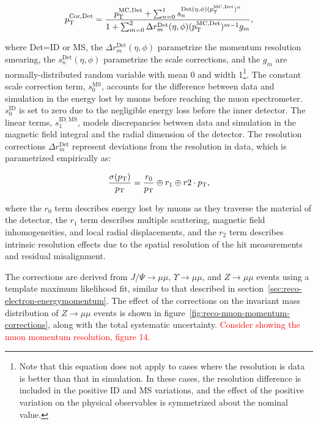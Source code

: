 \begin{equation}
	\pt^{\mathrm{Cor,Det}} = \frac{\pt^{\mathrm{MC,Det}} + \sum_{n=0}^1 s_n^{\mathrm{Det}(\eta,\phi)(\pt^{\mathrm{MC,Det}})^n}}{1+\sum_{m=0}^2 \Delta r_m^{\mathrm{Det}}(\eta,\phi)(\pt^{\mathrm{MC,Det}})^{m-1}g_m},
\end{equation}

where Det=ID or MS, the $\Delta r_m^{\mathrm{Det}}(\eta,\phi)$ parametrize the momentum resolution smearing, the $s_n^{\mathrm{Det}}(\eta,\phi)$ parametrize the scale corrections, and the $g_m$ are normally-distributed random variable with mean 0 and width 1\footnote{Note that this equation does not apply to cases where the resolution is data is better than that in simulation. In these cases, the resolution difference is included in the positive ID and MS variations, and the effect of the positive variation on the physical observables is symmetrized about the nominal value.}. The constant scale correction term, $s_0^{\mathrm{MS}}$, accounts for the difference between data and simulation in the energy lost by muons before reaching the muon spectrometer. $s_0^{\mathrm{ID}}$ is set to zero due to the negligible energy loss before the inner detector. The linear terms, $s_1^{\mathrm{ID,MS}}$, models discrepancies between data and simulation in the magnetic field integral and the radial dimension of the detector. The resolution corrections $\Delta r_m^{\mathrm{Det}}$ represent deviations from the resolution in data, which is parametrized empirically as:

\begin{equation}
	\frac{\sigma(p_{\text{T}})}{p_{\text{T}}} = \frac{r_0}{p_{\text{T}}} \oplus r_1 \oplus r2\cdot p_{\text{T}},
\end{equation}

where the $r_0$ term describes energy lost by muons as they traverse the material of the detector, the $r_1$ term describes multiple scattering, magnetic field inhomogeneities, and local radial displacements, and the $r_2$ term describes intrinsic resolution effects due to the spatial resolution of the hit measurements and residual misalignment. 

The corrections are derived from $J/\Psi\rightarrow\mu\mu$, $\Upsilon\rightarrow\mu\mu$, and $Z\rightarrow\mu\mu$ events using a template maximum likelihood fit, similar to that described in section~\ref{sec:reco-electron-energymomentum}. The effect of the corrections on the invariant mass distribution of $Z\rightarrow\mu\mu$ events is shown in figure~\ref{fig:reco-muon-momentum-corrections}, along with the total systematic uncertainty. \textcolor{red}{Consider showing the muon momentum resolution, figure 14.}

